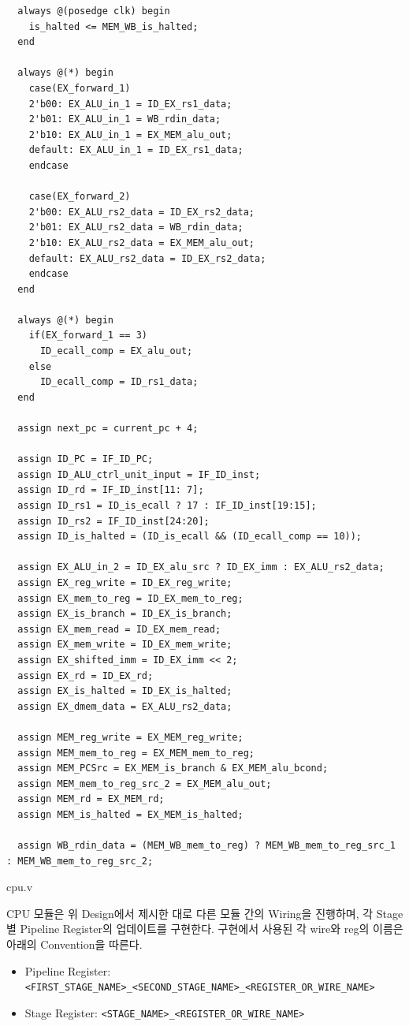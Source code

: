 \documentclass[openright, a4paper]{article}
\newcommand{\code}[1]{\texttt{#1}}
\newenvironment{longlisting}{\captionsetup{type=listing}}{}
\begin{document}
\begin{longlisting}
\begin{verbatim}
  always @(posedge clk) begin
    is_halted <= MEM_WB_is_halted;
  end

  always @(*) begin
    case(EX_forward_1)
    2'b00: EX_ALU_in_1 = ID_EX_rs1_data;
    2'b01: EX_ALU_in_1 = WB_rdin_data;
    2'b10: EX_ALU_in_1 = EX_MEM_alu_out;
    default: EX_ALU_in_1 = ID_EX_rs1_data;
    endcase
    
    case(EX_forward_2)
    2'b00: EX_ALU_rs2_data = ID_EX_rs2_data;
    2'b01: EX_ALU_rs2_data = WB_rdin_data;
    2'b10: EX_ALU_rs2_data = EX_MEM_alu_out;
    default: EX_ALU_rs2_data = ID_EX_rs2_data;
    endcase
  end

  always @(*) begin
    if(EX_forward_1 == 3)
      ID_ecall_comp = EX_alu_out;
    else
      ID_ecall_comp = ID_rs1_data;
  end

  assign next_pc = current_pc + 4;
  
  assign ID_PC = IF_ID_PC;
  assign ID_ALU_ctrl_unit_input = IF_ID_inst;
  assign ID_rd = IF_ID_inst[11: 7];
  assign ID_rs1 = ID_is_ecall ? 17 : IF_ID_inst[19:15];
  assign ID_rs2 = IF_ID_inst[24:20];
  assign ID_is_halted = (ID_is_ecall && (ID_ecall_comp == 10));
  
  assign EX_ALU_in_2 = ID_EX_alu_src ? ID_EX_imm : EX_ALU_rs2_data;
  assign EX_reg_write = ID_EX_reg_write;
  assign EX_mem_to_reg = ID_EX_mem_to_reg;
  assign EX_is_branch = ID_EX_is_branch;
  assign EX_mem_read = ID_EX_mem_read;
  assign EX_mem_write = ID_EX_mem_write;
  assign EX_shifted_imm = ID_EX_imm << 2;
  assign EX_rd = ID_EX_rd;
  assign EX_is_halted = ID_EX_is_halted;
  assign EX_dmem_data = EX_ALU_rs2_data;
  
  assign MEM_reg_write = EX_MEM_reg_write;
  assign MEM_mem_to_reg = EX_MEM_mem_to_reg;
  assign MEM_PCSrc = EX_MEM_is_branch & EX_MEM_alu_bcond;
  assign MEM_mem_to_reg_src_2 = EX_MEM_alu_out;
  assign MEM_rd = EX_MEM_rd;
  assign MEM_is_halted = EX_MEM_is_halted;
  
  assign WB_rdin_data = (MEM_WB_mem_to_reg) ? MEM_WB_mem_to_reg_src_1 : MEM_WB_mem_to_reg_src_2;
    \end{verbatim}
    \caption{cpu.v}
\end{longlisting}

CPU 모듈은 위 Design에서 제시한 대로 다른 모듈 간의 Wiring을 진행하며, 각 Stage별 Pipeline Register의 업데이트를 구현한다. 구현에서 사용된 각 wire와 reg의 이름은 아래의 Convention을 따른다.

\begin{itemize}
    \item Pipeline Register: \code{<FIRST_STAGE_NAME>_<SECOND_STAGE_NAME>_<REGISTER_OR_WIRE_NAME>}
    \item Stage Register: \code{<STAGE_NAME>_<REGISTER_OR_WIRE_NAME>}
\end{itemize}
\end{document}
